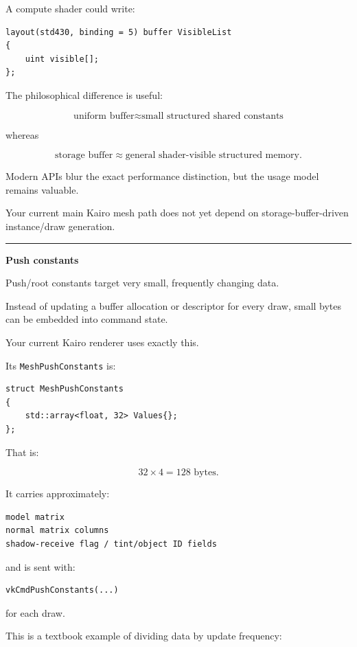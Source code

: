A compute shader could write:

\begin{verbatim}
layout(std430, binding = 5) buffer VisibleList
{
    uint visible[];
};
\end{verbatim}

The philosophical difference is useful:

\[
\text{uniform buffer}
\approx
\text{small structured shared constants}
\]

whereas

\[
\text{storage buffer}
\approx
\text{general shader-visible structured memory}.
\]

Modern APIs blur the exact performance distinction, but the usage model remains valuable.

Your current main Kairo mesh path does not yet depend on storage-buffer-driven instance/draw generation.

\begin{center}\rule{0.5\linewidth}{0.5pt}\end{center}

\textbf{Push constants}

Push/root constants target very small, frequently changing data.

Instead of updating a buffer allocation or descriptor for every draw, small bytes can be embedded into command state.

Your current Kairo renderer uses exactly this.

Its \texttt{MeshPushConstants} is:

\begin{verbatim}
struct MeshPushConstants
{
    std::array<float, 32> Values{};
};
\end{verbatim}

That is:

\[
32\times4=128\text{ bytes}.
\]

It carries approximately:

\begin{verbatim}
model matrix
normal matrix columns
shadow-receive flag / tint/object ID fields
\end{verbatim}

and is sent with:

\begin{verbatim}
vkCmdPushConstants(...)
\end{verbatim}

for each draw.

This is a textbook example of dividing data by update frequency:

